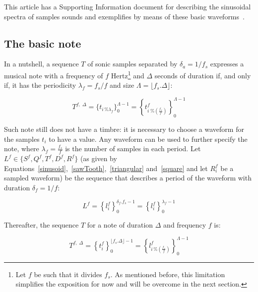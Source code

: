 This article has a Supporting Information document for describing the sinusoidal spectra of samples sounds and exemplifies by means of these basic waveforms~\cite{massNotesInMusic}.

\subsection{The basic note}\label{notaBasica}
In a nutshell,
a sequence $T$ of sonic samples separated by $\delta_a=1/f_s$ expresses a musical note with
a frequency of $f$ Hertz\footnote{Let $f$ be such that it divides $f_s$.
As mentioned before, this limitation simplifies the exposition for now
and will be overcome in the next section.} and $\Delta$ seconds of duration if,
and only if, it has the periodicity $\lambda_f=f_s/f$ and size $\Lambda=\lfloor f_s . \Delta \rfloor$:

\begin{equation}\label{eq:notaBasica}
T^{f,\; \Delta}=\{t_{i \, \% \lambda_f} \}_0^{\Lambda-1}= \left \{t^f_{i \; \% \left( \frac{f_s}{f} \right) } \right \}_0^{\Lambda-1}
\end{equation}

Such note still does not have a timbre: it is necessary to choose a waveform for the samples $t_i$ to have a value.
Any waveform can be used to further specify the note,
where $\lambda_f=\frac{f_s}{f}$ is the number of samples in each period.
Let $L^f \in \{S^f,Q^f,T^f,D^f,R^f \}$
(as given by Equations~\ref{sinusoid},~\ref{sawTooth},~\ref{triangular}
and~\ref{square} and let $R_i^f$ be a sampled waveform)
be the sequence that describes a period of the waveform 
 with duration $\delta_f=1/f$:

\begin{equation}\label{periodoUnico}
L^{f} = \left\{ l_i^f \right\}_0^{\delta_f . f_s -1}=\left\{ l_i^f \right\}_0^{\lambda_f-1}
\end{equation}

Thereafter, the sequence $T$ for a note of duration $\Delta$ and frequency $f$ is:

\begin{equation}\label{eq:notaBasicaTimbre}
T^{f,\; \Delta}=\left\{t_i^f\right\}_0^{\lfloor f_s . \Delta \rfloor -1}=\left \{ l^f_{i\,\%\left(\frac{f_s}{f}\right)} \right \}_0^{\Lambda-1}
\end{equation}

